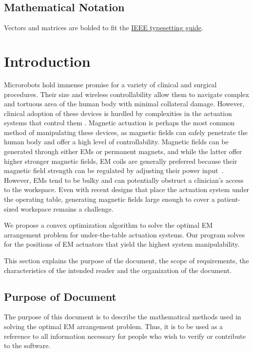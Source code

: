 \documentclass[12pt]{article}
\begin{document}
\subsection{Mathematical Notation}
Vectors and matrices are bolded to fit the \hyperlink{https://journals.ieeeauthorcenter.ieee.org/your-role-in-article-production/ieee-editorial-style-manual/}{IEEE typesetting guide}.

\newpage

\section{Introduction}
Microrobots hold immense promise for a variety of clinical and surgical procedures. Their size and wireless
controllability allow them to navigate complex and tortuous area of the human body with minimal collateral damage. However,
clinical adoption of these devices is hurdled by complexities in the actuation systems that control them \cite{bozuyuk2024roadmap}. Magnetic actuation is 
perhaps the most common method of manipulating these devices, as magnetic fields can safely penetrate the human body and offer a high level of controllability. Magnetic fields can be generated through either EMs
or permanent magnets, and while the latter offer higher stronger magnetic fields, EM coils are generally preferred
because their magnetic field strength can be regulated by adjusting their power input~\cite{hwang2020review}. However, EMs tend to be bulky and can potentially obstruct a clinician's access to the workspace. Even with recent designs that place the actuation system under the operating table, generating magnetic fields large enough to cover a patient-sized workspace remains a challenge. 

We propose a convex optimization algorithm to solve the optimal EM arrangement problem for under-the-table actuation systems. Our program solves for the positions of EM actuators that yield the highest system manipulability. 

This section explains the purpose of the document, the scope of requirements, the characteristics of the intended reader and the organization of the document.

\subsection{Purpose of Document}
The purpose of this document is to describe the mathematical methods used in solving the optimal EM arrangement problem. Thus, it is to be used as a reference to all information necessary for people who wish to verify or contribute to the software. 
\end{document}

